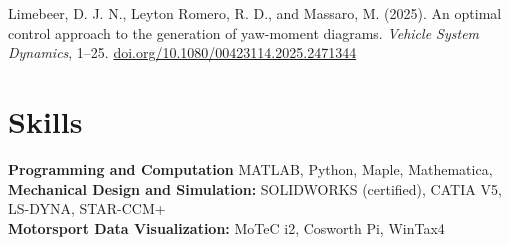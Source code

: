 \documentclass[12pt,letterpaper]{article} %
\begin{document}
Limebeer, D. J. N., Leyton Romero, R. D., and Massaro, M. (2025). An optimal control approach to the generation of yaw-moment diagrams. \textit{Vehicle System Dynamics}, 1–25. \href{https://doi.org/10.1080/00423114.2025.2471344}{doi.org/10.1080/00423114.2025.2471344}

\vspace{-10.5pt} %

\section*{Skills}
\textbf{Programming and Computation} MATLAB, Python, Maple, Mathematica, \\
\textbf{Mechanical Design and Simulation:} SOLIDWORKS (certified), CATIA V5, LS-DYNA, STAR-CCM+ \\
\textbf{Motorsport Data Visualization:} MoTeC i2, Cosworth Pi, WinTax4 \\

\vspace{-10.5pt} %

\end{document}
